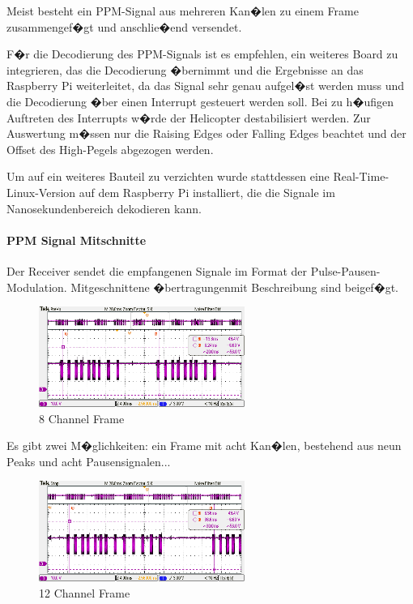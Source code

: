 Meist besteht ein PPM-Signal aus mehreren Kan�len zu einem Frame zusammengef�gt und  anschlie�end versendet.

F�r die Decodierung des PPM-Signals ist es empfehlen, ein weiteres Board zu integrieren, das die Decodierung  �bernimmt und die Ergebnisse an das Raspberry Pi weiterleitet, da das Signal sehr genau aufgel�st werden muss und die Decodierung �ber einen Interrupt gesteuert werden soll. Bei zu h�ufigen Auftreten des Interrupts w�rde der Helicopter destabilisiert werden. Zur Auswertung m�ssen nur die Raising Edges oder Falling Edges beachtet und der Offset des High-Pegels abgezogen werden.

Um auf ein weiteres Bauteil zu verzichten wurde stattdessen eine Real-Time-Linux-Version auf dem Raspberry Pi installiert, die die Signale im Nanosekundenbereich dekodieren kann.

\newpage
\paragraph{PPM Signal Mitschnitte}
Der Receiver sendet die empfangenen Signale im Format der Pulse-Pausen-Modulation. Mitgeschnittene �bertragungen\protect\footnotemark  mit Beschreibung sind beigef�gt.
\begin{figure}[H]
	\centering
	\includegraphics[width=0.6\textwidth]{fig/Controller_Treiber/GraupnerGR16_8_Frame.png}
	\caption[8 Channel Frame]{8 Channel Frame}
\end{figure}

Es gibt zwei M�glichkeiten: ein Frame mit acht Kan�len, bestehend aus neun Peaks und acht Pausensignalen...

\begin{figure}[H]
	\centering
	\includegraphics[width=0.6\textwidth]{fig/Controller_Treiber/GraupnerGR16_12_Frame.png}
	\caption[12 Channel Frame]{12 Channel Frame}
\end{figure}

